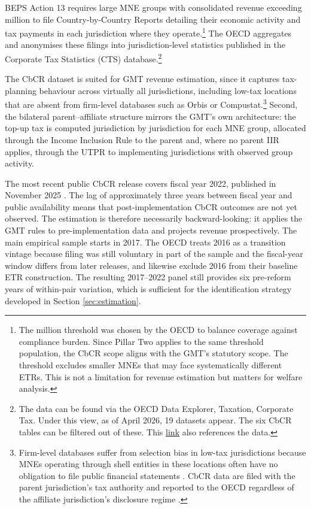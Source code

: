 \documentclass[11pt,a4paper]{article}
\newcommand{\EUR}{\texteuro}
\begin{document}
BEPS Action 13 requires large MNE groups with consolidated revenue exceeding \EUR750 million to file Country-by-Country Reports detailing their economic activity and tax payments in each jurisdiction where they operate.\footnote{The \EUR750 million threshold was chosen by the OECD to balance coverage against compliance burden. Since Pillar Two applies to the same threshold population, the CbCR scope aligns with the GMT's statutory scope. The threshold excludes smaller MNEs that may face systematically different ETRs. This is not a limitation for revenue estimation but matters for welfare analysis.} The OECD aggregates and anonymises these filings into jurisdiction-level statistics published in the Corporate Tax Statistics (CTS) database.\footnote{The data can be found via the OECD Data Explorer, Taxation, Corporate Tax. Under this view, as of April 2026, 19 datasets appear. The six CbCR tables can be filtered out of these. This \href{https://data-explorer.oecd.org/?fs\%5B0\%5D=Topic\%2C1\%7CTaxation\%23TAX\%23\%7CCorporate\%20tax\%23TAX_CPT\%23&pg=0&fc=Topic&bp=true&snb=19}{link} also references the data.}

The CbCR dataset is suited for GMT revenue estimation, since it captures tax-planning behaviour across virtually all jurisdictions, including low-tax locations that are absent from firm-level databases such as Orbis or Compustat.\footnote{Firm-level databases suffer from selection bias in low-tax jurisdictions because MNEs operating through shell entities in these locations often have no obligation to file public financial statements \citep{torslov2023}. CbCR data are filed with the parent jurisdiction's tax authority and reported to the OECD regardless of the affiliate jurisdiction's disclosure regime \citep{oecd2025a}.} Second, the bilateral parent--affiliate structure mirrors the GMT's own architecture: the top-up tax is computed jurisdiction by jurisdiction for each MNE group, allocated through the Income Inclusion Rule to the parent and, where no parent IIR applies, through the UTPR to implementing jurisdictions with observed group activity. 

The most recent public CbCR release covers fiscal year 2022, published in November 2025 \citep{oecd2025a}. The lag of approximately three years between fiscal year and public availability means that post-implementation CbCR outcomes are not yet observed. The estimation is therefore necessarily backward-looking: it applies the GMT rules to pre-implementation data and projects revenue prospectively. The main empirical sample starts in 2017. The OECD treats 2016 as a transition vintage because filing was still voluntary in part of the sample and the fiscal-year window differs from later releases, and \citet{hugger2026} likewise exclude 2016 from their baseline ETR construction. The resulting 2017--2022 panel still provides six pre-reform years of within-pair variation, which is sufficient for the identification strategy developed in Section \ref{sec:estimation}.
\end{document}
